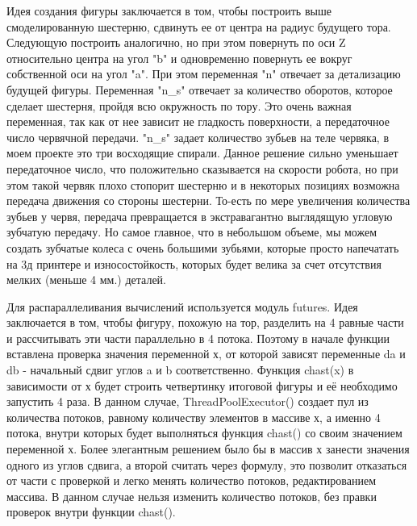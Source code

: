 Идея создания фигуры заключается в том, чтобы построить выше смоделированную шестерню, сдвинуть ее от центра на радиус будущего тора. Следующую построить аналогично, но при этом повернуть по оси Z относительно центра на угол "b" и одновременно повернуть ее вокруг собственной оси на угол "a". При этом переменная "n" отвечает за детализацию будущей фигуры. Переменная "n\_s" отвечает за количество оборотов, которое сделает шестерня, пройдя всю окружность по тору. Это очень важная переменная, так как от  нее зависит не гладкость поверхности, а передаточное число червячной передачи. "n\_s" задает количество зубьев на теле червяка, в моем проекте это три восходящие спирали. Данное решение сильно уменьшает передаточное число, что положительно сказывается на скорости робота, но при этом такой червяк плохо стопорит шестерню и в некоторых позициях возможна передача движения со стороны шестерни. То-есть по мере увеличения количества зубьев у червя, передача превращается в экстравагантно выглядящую угловую зубчатую передачу. Но самое главное, что в небольшом объеме, мы можем создать зубчатые колеса с очень большими зубьями, которые просто напечатать на 3д принтере и износостойкость, которых будет велика за счет отсутствия мелких (меньше 4 мм.) деталей. 

Для распараллеливания вычислений используется модуль futures. Идея заключается в том, чтобы фигуру, похожую на тор, разделить на 4 равные части и рассчитывать эти части параллельно в 4 потока. Поэтому в начале функции вставлена проверка значения переменной х, от которой зависят переменные da и db - начальный сдвиг углов a и b соответственно. Функция chast(x) в зависимости от х будет строить четвертинку итоговой фигуры и её необходимо запустить 4 раза. В данном случае, ThreadPoolExecutor() создает пул из количества потоков, равному количеству элементов в массиве х, а именно 4 потока, внутри которых будет выполняться функция chast() со своим значением переменной х. Более элегантным решением было бы в массив х занести значения одного из углов сдвига, а второй считать через формулу, это позволит отказаться от части с проверкой и легко менять количество потоков, редактированием массива. В данном случае нельзя изменить количество потоков, без правки проверок внутри функции chast().   


